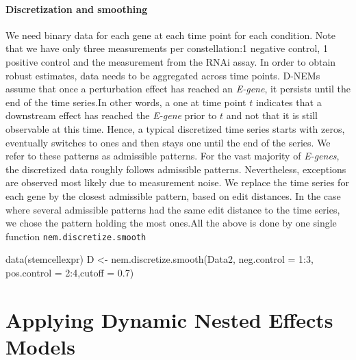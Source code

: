 \documentclass[11pt,a4paper]{article}
\begin{document}
\paragraph{Discretization and smoothing}
We need binary data for each gene at each time point for each condition.
Note that we have only three measurements per constellation:1 negative control, 1 positive control and the measurement from the RNAi assay. In order to obtain robust estimates, data needs to be aggregated across time points.
D-NEMs assume that once a perturbation effect has reached an 	\textit{E-gene}, it persists until the end of the time series.In other words, a one at time point $t$ indicates that a downstream effect has reached the \textit{E-gene} prior to $t$ and not that it is still observable at this time. Hence, a typical discretized time series starts with zeros, 
eventually switches to ones and then stays one until the end of the series. We refer to these patterns
as admissible patterns. For the vast majority of \textit{E-genes}, the discretized data roughly follows admissible patterns. 
Nevertheless, exceptions are observed most likely due to measurement noise.
We replace the time series for each gene by the closest admissible pattern, based on edit distances.
In the case where several admissible patterns had the same edit distance to the time series, 
we chose the pattern holding the most ones.All the above is done by one single function \texttt{nem.discretize.smooth}
\begin{Schunk}
\begin{Sinput}
 data(stemcellexpr)
 D <- nem.discretize.smooth(Data2, neg.control = 1:3,
      pos.control = 2:4,cutoff = 0.7)
\end{Sinput}
\end{Schunk}



\clearpage\section{Applying Dynamic Nested Effects Models}
\end{document}
